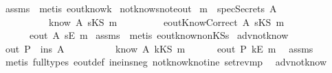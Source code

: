 \begin{isabellebody}
\isatagproof
{}\isamarkupfalse \ assms\ \isamarkupfalse \ {\isacharparenleft}metis\ eout{\isacharunderscore}know{\isacharunderscore}k{\isacharparenright}\endisatagproof
{\isafoldproof}\isadelimproof
\isanewline
\endisadelimproof
\isanewline
{}\isamarkupfalse \ not{\isacharunderscore}know{\isacharunderscore}s{\isacharunderscore}not{\isacharunderscore}eout{\isacharcolon}\isanewline
{}\ {\isachardoublequoteopen}m\ {\isasymnotin}\ specSecrets\ A{\isachardoublequoteclose}\isanewline
\ \ \ \ \ \ \ \ \ {\isachardoublequoteopen}{\isasymnot}\ know\ A\ {\isacharparenleft}sKS\ m{\isacharparenright}{\isachardoublequoteclose}\isanewline
\ \ \ \ \ \ \ \ \ {\isachardoublequoteopen}eoutKnowCorrect\ A\ {\isacharparenleft}sKS\ m{\isacharparenright}{\isachardoublequoteclose}\isanewline
{}\ \ \ \ \ {\isachardoublequoteopen}{\isasymnot}\ eout\ A\ {\isacharparenleft}sE\ m{\isacharparenright}{\isachardoublequoteclose}\isanewline
\isadelimproof
\endisadelimproof
\isatagproof
{}\isamarkupfalse \ assms\ \isamarkupfalse \ {\isacharparenleft}metis\ eout{\isacharunderscore}know{\isacharunderscore}nonKS{\isacharunderscore}s{\isacharparenright}\endisatagproof
{\isafoldproof}\isadelimproof
\isanewline
\endisadelimproof
\isanewline
{}\isamarkupfalse \ adv{\isacharunderscore}not{\isacharunderscore}know{}{\isacharcolon}\isanewline
{}\ {\isachardoublequoteopen}out\ P\ {\isasymsubseteq}\ ins\ A{\isachardoublequoteclose}\isanewline
\ \ \ \ \ \ \ \ \ {\isachardoublequoteopen}{\isasymnot}\ know\ A\ {\isacharparenleft}kKS\ m{\isacharparenright}{\isachardoublequoteclose}\ \isanewline
{}\ \ \ \ {\isachardoublequoteopen}{\isasymnot}\ eout\ P\ {\isacharparenleft}kE\ m{\isacharparenright}{\isachardoublequoteclose}\ \isanewline
\isadelimproof
\endisadelimproof
\isatagproof
{}\isamarkupfalse \ assms\isanewline
{}\isamarkupfalse \ {\isacharparenleft}metis\ {\isacharparenleft}full{\isacharunderscore}types{\isacharparenright}\ eout{\isacharunderscore}def\ ine{\isacharunderscore}ins{\isacharunderscore}neg{}\ not{\isacharunderscore}know{\isacharunderscore}k{\isacharunderscore}not{\isacharunderscore}ine\ set{\isacharunderscore}rev{\isacharunderscore}mp{\isacharparenright}\endisatagproof
{\isafoldproof}\isadelimproof
\isanewline
\endisadelimproof
\isanewline
{}\isamarkupfalse \ \ adv{\isacharunderscore}not{\isacharunderscore}know{}{\isacharcolon}\isanewline

\end{isabellebody}
